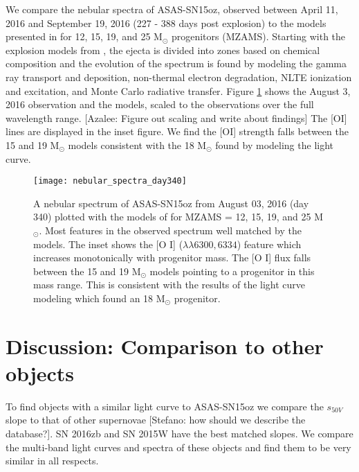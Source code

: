 \documentclass[preprint]{aastex61}
\newcommand{\azaleecomment}[1]{{\color{red} [{#1}]}}
\newcommand{\Azalee}[1]{\azaleecomment{Azalee: #1}}
\newcommand{\stefanocomment}[1]{{\color{cyan} [{#1}]}}
\newcommand{\Stefano}[1]{\stefanocomment{Stefano: #1}}
\begin{document}
We compare the nebular spectra of ASAS-SN15oz, observed between April 11, 2016 and September 19, 2016 (227 - 388 days post explosion) to the models presented in \citet{2014jerkstrand} for 12, 15, 19, and 25 M$_{\odot}$ progenitors (MZAMS).
Starting with the explosion models from \citet{2007woosley}, the ejecta is divided into zones based on chemical composition and the evolution of the spectrum is found by modeling the gamma ray transport and deposition, non-thermal electron degradation, NLTE ionization and excitation, and Monte Carlo radiative transfer.
Figure \ref{fig:neb} shows the August 3, 2016 observation and the models, scaled to the observations over the full wavelength range.
\Azalee{Figure out scaling and write about findings}
The [OI] lines are displayed in the inset figure. 
We find the [OI] strength falls between the 15 and 19 M$_\odot$ models consistent with the 18 M$_{\odot}$ found by modeling the light curve.

\begin{figure}[h!] 
\begin{center}
\texttt{[image: nebular\_spectra\_day340]} %
\caption{A nebular spectrum of ASAS-SN15oz from August 03, 2016 (day 340) plotted with the models of \citet{2014jerkstrand} for MZAMS = 12, 15, 19, and 25 M$_{\odot}$. 
Most features in the observed spectrum well matched by the models. 
The inset shows the [O I] ($\lambda\lambda6300, 6334$) feature which increases monotonically with progenitor mass. 
The [O I] flux falls between the 15 and 19 M$_{\odot}$ models pointing to a progenitor in this mass range. 
This is consistent with the results of the light curve modeling which found an 18 M$_{\odot}$ progenitor.}
\label{fig:neb}
\end{center}
\end{figure}

\section{Discussion: Comparison to other objects} 
To find objects with a similar light curve to ASAS-SN15oz we compare the $s_{50V}$ slope to that of other supernovae \Stefano{how should we describe the database?}.
SN 2016zb and SN 2015W have the best matched slopes. We compare the multi-band light curves and spectra of these objects and find them to be very similar in all respects.
\end{document}
